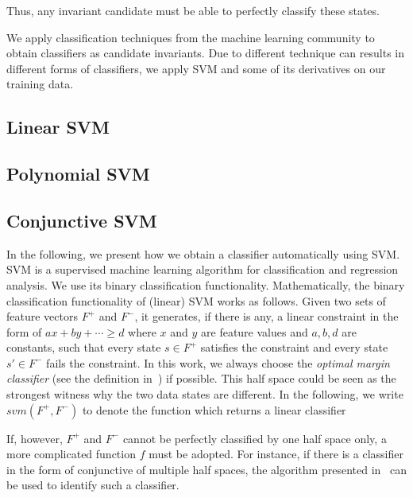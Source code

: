 Thus, any invariant candidate must be able to perfectly classify these states. 

We apply classification techniques from the machine learning community to obtain classifiers as candidate invariants.
Due to different technique can results in different forms of classifiers,
we apply SVM and some of its derivatives on our training data. 

\subsection{Linear SVM}
\subsection{Polynomial SVM}
\subsection{Conjunctive SVM}
In the following, we present how we obtain a classifier automatically using SVM. 
SVM is a supervised machine learning algorithm for classification and regression analysis. 
We use its binary classification functionality. 
Mathematically, the binary classification functionality of (linear) SVM works as follows. 
Given two sets of feature vectors $F^+$ and $F^-$, it generates, if there is any, 
a linear constraint in the form of $ax + by + \cdots \geq d$ where $x$ and $y$ are feature values and $a, b, d$ are constants, 
such that every state $s \in F^+$ satisfies the constraint and every state $s' \in F^-$ fails the constraint. 
In this work, we always choose the \textit{optimal margin classifier} (see the definition in~\cite{Sharma2012}) if possible. 
This half space could be seen as the strongest witness why the two data states are different. 
In the following, we write $svm(F^+, F^-)$ to denote the function which returns a linear classifier

If, however, $F^+$ and $F^-$ cannot be perfectly classified by one half space only, 
a more complicated function $f$ must be adopted. 
For instance, if there is a classifier in the form of conjunctive of multiple half spaces, 
the algorithm presented in~\cite{Sharma2012} can be used to identify such a classifier.


